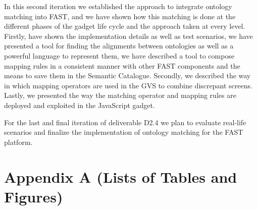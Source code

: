 \documentclass{fast_latex}
\begin{document}
In this second iteration we established the approach to integrate ontology matching into FAST, and we have shown how this matching is done at the different phases of the gadget life cycle and the approach taken at every level. Firstly, have shown the implementation details as well as test scenarios, we have presented a tool for finding the alignments between ontologies as well as a powerful language to represent them, we have described a tool to compose mapping rules in a consistent manner with other FAST components and the means to save them in the Semantic Catalogue. Secondly, we described the way in which mapping operators are used in the GVS to combine discrepant screens. Lastly, we presented the way the matching operator and mapping rules are deployed and exploited in the JavaScript gadget.

For the last and final iteration of deliverable D2.4 we plan to evaluate real-life scenarios and finalize the implementation of ontology matching for the FAST platform.

\clearpage



\clearpage
\doublespacing
\section*{Appendix A (Lists of Tables and Figures)}

\listoftables

\listoffigures
\end{document}
